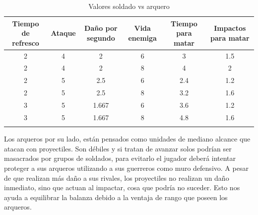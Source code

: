 \begin{longtable}[c]{|c|c|c|c|c|c|}
\hline
\multicolumn{1}{|m{1.8cm}|}{Tiempo de refresco} & \multicolumn{1}{m{1.2cm}|}{Ataque}             &
\multicolumn{1}{m{1.7cm}|}{Daño por segundo}   & \multicolumn{1}{m{1.4cm}|}{Vida enemiga}        &
\multicolumn{1}{m{1.2cm}|}{Tiempo para matar}  & \multicolumn{1}{m{1.45cm}|}{Impactos para matar}\\
\hline
\hline
\endhead
\multicolumn{1}{|S|}{2} & \multicolumn{1}{S|}{4} & \multicolumn{1}{S|}{2} & 
\multicolumn{1}{S|}{6}  & \multicolumn{1}{S|}{3} & \multicolumn{1}{S|}{1.5} \\
\hline
\multicolumn{1}{|S|}{2} & \multicolumn{1}{S|}{4} & \multicolumn{1}{S|}{2}   & 
\multicolumn{1}{S|}{8}  & \multicolumn{1}{S|}{4} & \multicolumn{1}{S|}{2} \\ 
\hline
\multicolumn{1}{|S|}{2} & \multicolumn{1}{S|}{5}   & \multicolumn{1}{S|}{2.5} & 
\multicolumn{1}{S|}{6}  & \multicolumn{1}{S|}{2.4} & \multicolumn{1}{S|}{1.2} \\ 
\hline
\multicolumn{1}{|S|}{2} & \multicolumn{1}{S|}{5}   & \multicolumn{1}{S|}{2.5} & 
\multicolumn{1}{S|}{8}  & \multicolumn{1}{S|}{3.2} & \multicolumn{1}{S|}{1.6} \\
\hline
\multicolumn{1}{|S|}{3} & \multicolumn{1}{S|}{5}   & \multicolumn{1}{S|}{1.667} & 
\multicolumn{1}{S|}{6}  & \multicolumn{1}{S|}{3.6} & \multicolumn{1}{S|}{1.2}   \\
\hline
\multicolumn{1}{|S|}{3} & \multicolumn{1}{S|}{5}   & \multicolumn{1}{S|}{1.667} & 
\multicolumn{1}{S|}{8}  & \multicolumn{1}{S|}{4.8} & \multicolumn{1}{S|}{1.6}   \\
\hline
\caption{Valores soldado vs arquero}
\end{longtable}

Los arqueros por su lado, están pensados como unidades de mediano alcance que atacan con proyectiles.
Son débiles y si tratan de avanzar solos podrían ser masacrados por grupos de soldados, para evitarlo 
el jugador deberá intentar proteger a sus arqueros utilizando a sus guerreros como muro defensivo. 
A pesar de que realizan más daño a sus rivales, los proyectiles no realizan un daño inmediato, sino que
actuan al impactar, cosa que podría no suceder. Esto nos ayuda a equilibrar la balanza debido a la ventaja
de rango que poseen los arqueros.

